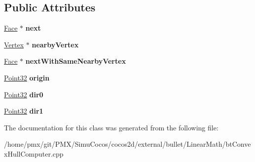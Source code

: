 \subsection*{Public Attributes}
\begin{DoxyCompactItemize}
\item 
\mbox{\label{classbtConvexHullInternal_1_1Face_acbddb68e9a6bc35235c1a557ad908e11}} 
\hyperlink{classbtConvexHullInternal_1_1Face}{Face} $\ast$ {\bfseries next}
\item 
\mbox{\label{classbtConvexHullInternal_1_1Face_a0d19b988a641599b38d6ec2e84a98347}} 
\hyperlink{classbtConvexHullInternal_1_1Vertex}{Vertex} $\ast$ {\bfseries nearby\+Vertex}
\item 
\mbox{\label{classbtConvexHullInternal_1_1Face_a0faf4bf1fbed371bfe738116ca05a241}} 
\hyperlink{classbtConvexHullInternal_1_1Face}{Face} $\ast$ {\bfseries next\+With\+Same\+Nearby\+Vertex}
\item 
\mbox{\label{classbtConvexHullInternal_1_1Face_a0ffa6b88943115a721e1fc5447319eeb}} 
\hyperlink{classbtConvexHullInternal_1_1Point32}{Point32} {\bfseries origin}
\item 
\mbox{\label{classbtConvexHullInternal_1_1Face_a25facf936057bae8d480e04563a1df68}} 
\hyperlink{classbtConvexHullInternal_1_1Point32}{Point32} {\bfseries dir0}
\item 
\mbox{\label{classbtConvexHullInternal_1_1Face_a2f47cc84817fa5e93d4b9925760abc6a}} 
\hyperlink{classbtConvexHullInternal_1_1Point32}{Point32} {\bfseries dir1}
\end{DoxyCompactItemize}


The documentation for this class was generated from the following file\+:\begin{DoxyCompactItemize}
\item 
/home/pmx/git/\+P\+M\+X/\+Simu\+Cocos/cocos2d/external/bullet/\+Linear\+Math/bt\+Convex\+Hull\+Computer.\+cpp\end{DoxyCompactItemize}

